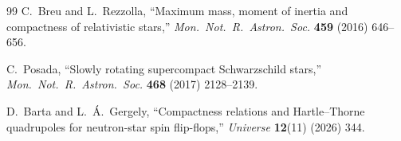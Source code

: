 \documentclass[11pt]{article}
\theoremstyle{plain}
\theoremstyle{definition}
\begin{document}
\begin{thebibliography}{99}
C.~Breu and L.~Rezzolla,
``Maximum mass, moment of inertia and compactness of relativistic stars,''
\emph{Mon.\ Not.\ R.\ Astron.\ Soc.} \textbf{459} (2016) 646--656.

C.~Posada,
``Slowly rotating supercompact Schwarzschild stars,''
\emph{Mon.\ Not.\ R.\ Astron.\ Soc.} \textbf{468} (2017) 2128--2139.

D.~Barta and L.~\'A.~Gergely,
``Compactness relations and Hartle--Thorne quadrupoles for neutron-star spin flip-flops,''
\emph{Universe} \textbf{12}(11) (2026) 344.

\end{thebibliography}
\end{document}
